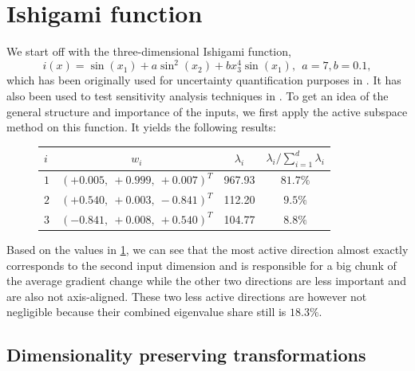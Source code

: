 \documentclass[
  a4paper,  %
  twoside,  %
  bibliography=totoc,
  headsepline,
  cleardoublepage=empty,
  parskip=half,
  draft=false
]{scrbook}
\begin{document}
\section{Ishigami function}

We start off with the three-dimensional Ishigami function,
\begin{equation}
i(x)=\sin(x_1) + a \sin^2(x_2) + b x_3^4 \sin(x_1), ~~ a = 7, b=0.1,
\end{equation}
%
which has been originally used for uncertainty quantification purposes in \cite{Ishigami1990AnIQ}.
It has also been used to test sensitivity analysis techniques in \cite{Sobol1999}.
To get an idea of the general structure and importance of the inputs, we first apply the active subspace method on this function. It yields the following results:
\begin{mdframed}[style=style]
\begin{figure}[H]
\centering

\bgroup
\def\arraystretch{1.2}%
  \begin{tabular}{ l | c c c}
$i$ & $w_i$ & $\lambda_i$ & $\lambda_i / \sum_{i=1}^d \lambda_i$\\
\hline
$1$ & $(+0.005, ~+0.999, ~+0.007)^T$ & 967.93 & $81.7\%$\\
$2$  & $(+0.540, ~+0.003, ~-0.841)^T$ & 112.20 & $9.5\%$\\
$3$ & $(-0.841, ~+0.008, ~+0.540)^T$ & 104.77 & $8.8\%$\\
\end{tabular}
\egroup
\vspace{0.5em}

\delimit

\label{tab:ishigami_as}
\end{figure}
\end{mdframed}
%
Based on the values in \cref{tab:ishigami_as}, we can see that the most active direction almost exactly corresponds to the second input dimension and is responsible for a big chunk of the average gradient change while the other two directions are less important and are also not axis-aligned.
These two less active directions are however not negligible because their combined eigenvalue share still is $18.3\%$.

\subsection{Dimensionality preserving transformations}
\end{document}
